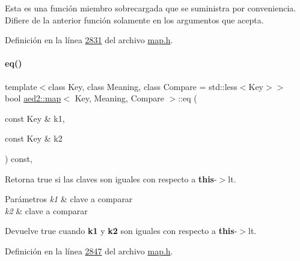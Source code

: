 Esta es una función miembro sobrecargada que se suministra por conveniencia. Difiere de la anterior función solamente en los argumentos que acepta. 

Definición en la línea \hyperlink{map_8h_source_l02831}{2831} del archivo \hyperlink{map_8h_source}{map.\+h}.

\mbox{\label{classaed2_1_1map_aebf6c09c424c39a874798165401b309e_aebf6c09c424c39a874798165401b309e}} 
\paragraph{\texorpdfstring{eq()}{eq()}}
{\footnotesize\ttfamily template$<$class Key, class Meaning, class Compare = std\+::less$<$\+Key$>$$>$ \\
bool \hyperlink{classaed2_1_1map}{aed2\+::map}$<$ Key, Meaning, Compare $>$\+::eq (\begin{DoxyParamCaption}\item[{const Key \&}]{k1,  }\item[{const Key \&}]{k2 }\end{DoxyParamCaption}) const\hspace{0.3cm}{\ttfamily [inline]}, {\ttfamily [private]}}



Retorna true si las claves son iguales con respecto a {\bfseries this}-\/$>$lt. 


\begin{DoxyParams}{Parámetros}
{\em k1} & clave a comparar \\
\hline
{\em k2} & clave a comparar \\
\hline
\end{DoxyParams}
\begin{DoxyReturn}{Devuelve}
true cuando {\bfseries k1} y {\bfseries k2} son iguales con respecto a {\bfseries this}-\/$>$lt. 
\end{DoxyReturn}


Definición en la línea \hyperlink{map_8h_source_l02847}{2847} del archivo \hyperlink{map_8h_source}{map.\+h}.

\mbox{\label{classaed2_1_1map_a533bd88d0b7a584e3c968548d246c255_a533bd88d0b7a584e3c968548d246c255}} 
